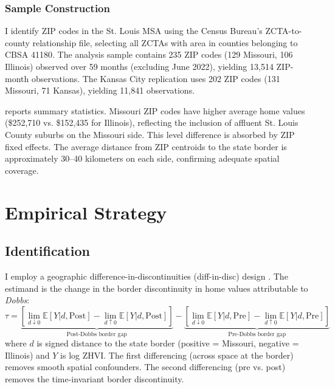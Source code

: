 \documentclass[12pt]{article}
\newcommand{\E}{\mathbb{E}}
\begin{document}
\subsubsection*{Sample Construction} I identify ZIP codes in the St. Louis MSA using the Census Bureau's ZCTA-to-county relationship file, selecting all ZCTAs with area in counties belonging to CBSA 41180. The analysis sample contains 235 ZIP codes (129 Missouri, 106 Illinois) observed over 59 months (excluding June 2022), yielding 13,514 ZIP-month observations. The Kansas City replication uses 202 ZIP codes (131 Missouri, 71 Kansas), yielding 11,841 observations.



 reports summary statistics. Missouri ZIP codes have higher average home values (\$252,710 vs. \$152,435 for Illinois), reflecting the inclusion of affluent St. Louis County suburbs on the Missouri side. This level difference is absorbed by ZIP fixed effects. The average distance from ZIP centroids to the state border is approximately 30--40 kilometers on each side, confirming adequate spatial coverage.

\section{Empirical Strategy}
\label{sec:strategy}

\subsection{Identification}

I employ a geographic difference-in-discontinuities (diff-in-disc) design \citep{grembi2016fiscal}. The estimand is the change in the border discontinuity in home values attributable to \textit{Dobbs}:
\begin{equation}
\tau = \underbrace{\left[\lim_{d \downarrow 0} \E[Y|d, \text{Post}] - \lim_{d \uparrow 0} \E[Y|d, \text{Post}]\right]}_{\text{Post-Dobbs border gap}} - \underbrace{\left[\lim_{d \downarrow 0} \E[Y|d, \text{Pre}] - \lim_{d \uparrow 0} \E[Y|d, \text{Pre}]\right]}_{\text{Pre-Dobbs border gap}}
\end{equation}
where $d$ is signed distance to the state border (positive = Missouri, negative = Illinois) and $Y$ is log ZHVI. The first differencing (across space at the border) removes smooth spatial confounders. The second differencing (pre vs. post) removes the time-invariant border discontinuity.
\end{document}

